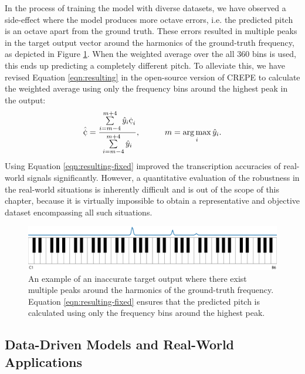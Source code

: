 In the process of training the model with diverse datasets, we have observed a side-effect where the model produces more octave errors, i.e. the predicted pitch is an octave apart from the ground truth.
These errors resulted in multiple peaks in the target output vector around the harmonics of the ground-truth frequency, as depicted in Figure \ref{fig:octave-errors}.
When the weighted average over the all 360 bins is used, this ends up predicting a completely different pitch.
To alleviate this, we have revised Equation \ref{eqn:resulting} in the open-source version of CREPE to calculate the weighted average using only the frequency bins around the highest peak in the output:
\begin{equation}\label{eqn:resulting-fixed}
\hat{\cent} = \frac{\sum\limits_{i=m-4}^{m+4}\hat{y}_i \cent_i}{\sum\limits_{i=m-4}^{m+4} \hat{y}_i},
~~~~~~~~~ m = \argmax_i \hat{y}_i.
\end{equation}
Using Equation \ref{eqn:resulting-fixed} improved the transcription accuracies of real-world signals significantly. However, a quantitative evaluation of the robustness in the real-world situations is inherently difficult and is out of the scope of this chapter, because it is virtually impossible to obtain a representative and objective dataset encompassing all such situations.

\begin{figure}
	\centering
	\includegraphics[width=\textwidth]{octave-errors.pdf}
	\caption{An example of an inaccurate target output where there exist multiple peaks around the harmonics of the ground-truth frequency. Equation \ref{eqn:resulting-fixed} ensures that the predicted pitch is calculated using only the frequency bins around the highest peak.}\label{fig:octave-errors}
\end{figure}

\subsection{Data-Driven Models and Real-World Applications}

